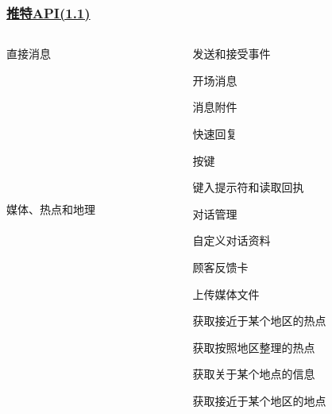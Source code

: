 \documentclass[../Postbot.tex]{subfiles}
\begin{document}
	\begin{frame}
		\frametitle{\href{https://developer.twitter.com/en/products/twitter-api}{推特API(1.1)}}
		\begin{columns}
			\begin{column}{.2\textwidth}
				\centering
				{\normalsize 直接消息} \\
				\hspace*{\fill} \\
				\hspace*{\fill} \\
				\hspace*{\fill} \\
				\hspace*{\fill} \\
				\hspace*{\fill} \\
				\hspace*{\fill} \\
				\hspace*{\fill} \\
				\hspace*{\fill} \\
				\hspace*{\fill} \\
				{\normalsize 媒体、热点和地理} \\
				\hspace*{\fill} \\
				\hspace*{\fill} \\
			\end{column}

			\begin{column}{.7\textwidth}
				\begin{itemize}{
					\small
					\item 发送和接受事件
					\item 开场消息
					\item 消息附件
					\item 快速回复
					\item 按键
					\item 键入提示符和读取回执
					\item 对话管理
					\item 自定义对话资料
					\item 顾客反馈卡
					}
				\end{itemize}
				\vspace*{\fill} 
				\begin{itemize}{
					\small
					\item 上传媒体文件
					\item 获取接近于某个地区的热点
					\item 获取按照地区整理的热点
					\item 获取关于某个地点的信息
					\item 获取接近于某个地区的地点
				}
				\end{itemize}
			\end{column}
		\end{columns}
	\end{frame}
\end{document}
